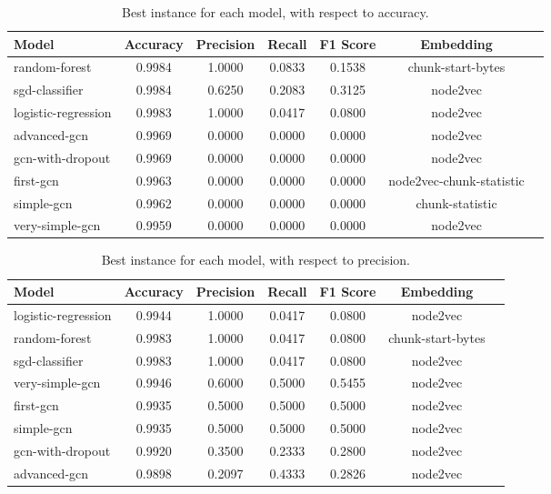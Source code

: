 \begin{table}[H]
    \centering
    \caption{Best instance for each model, with respect to accuracy.}
    \begin{tabular}{|l|c|c|c|c|c|c|} \hline 
      \textbf{Model}  & \textbf{Accuracy} & \textbf{Precision} & \textbf{Recall} & \textbf{F1 Score} & \textbf{Embedding}  \\ \hline 
        random-forest & 0.9984 & 1.0000 & 0.0833 & 0.1538 & chunk-start-bytes \\ \hline 
        sgd-classifier & 0.9984 & 0.6250 & 0.2083 & 0.3125 & node2vec \\ \hline 
        logistic-regression & 0.9983 & 1.0000 & 0.0417 & 0.0800 & node2vec \\ \hline 
        advanced-gcn & 0.9969 & 0.0000 & 0.0000 & 0.0000 & node2vec \\ \hline 
        gcn-with-dropout & 0.9969 & 0.0000 & 0.0000 & 0.0000 & node2vec \\ \hline 
        first-gcn & 0.9963 & 0.0000 & 0.0000 & 0.0000 & node2vec-chunk-statistic \\ \hline 
        simple-gcn & 0.9962 & 0.0000 & 0.0000 & 0.0000 & chunk-statistic \\ \hline 
        very-simple-gcn & 0.9959 & 0.0000 & 0.0000 & 0.0000 & node2vec \\ \hline 
    \end{tabular}
\end{table}


\begin{table}[H]
    \centering
    \caption{Best instance for each model, with respect to precision.}
    \begin{tabular}{|l|c|c|c|c|c|c|} \hline 
      \textbf{Model}  & \textbf{Accuracy} & \textbf{Precision} & \textbf{Recall} & \textbf{F1 Score} & \textbf{Embedding}  \\ \hline 
        logistic-regression & 0.9944 & 1.0000 & 0.0417 & 0.0800 & node2vec \\ \hline 
        random-forest & 0.9983 & 1.0000 & 0.0417 & 0.0800 & chunk-start-bytes \\ \hline 
        sgd-classifier & 0.9983 & 1.0000 & 0.0417 & 0.0800 & node2vec \\ \hline 
        very-simple-gcn & 0.9946 & 0.6000 & 0.5000 & 0.5455 & node2vec \\ \hline 
        first-gcn & 0.9935 & 0.5000 & 0.5000 & 0.5000 & node2vec \\ \hline 
        simple-gcn & 0.9935 & 0.5000 & 0.5000 & 0.5000 & node2vec \\ \hline 
        gcn-with-dropout & 0.9920 & 0.3500 & 0.2333 & 0.2800 & node2vec \\ \hline 
        advanced-gcn & 0.9898 & 0.2097 & 0.4333 & 0.2826 & node2vec \\ \hline 
    \end{tabular}
\end{table}


